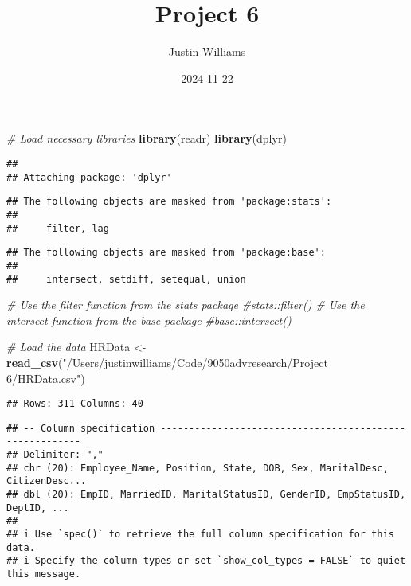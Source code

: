 \documentclass[
]{article}
\title{Project 6}
\author{Justin Williams}
\date{2024-11-22}
\newenvironment{Shaded}{\begin{snugshade}}{\end{snugshade}}
\newcommand{\CommentTok}[1]{\textcolor[rgb]{0.56,0.35,0.01}{\textit{#1}}}
\newcommand{\FunctionTok}[1]{\textcolor[rgb]{0.13,0.29,0.53}{\textbf{#1}}}
\newcommand{\NormalTok}[1]{#1}
\newcommand{\OtherTok}[1]{\textcolor[rgb]{0.56,0.35,0.01}{#1}}
\newcommand{\StringTok}[1]{\textcolor[rgb]{0.31,0.60,0.02}{#1}}
\begin{document}
\maketitle

\begin{Shaded}
\begin{Highlighting}[]
\CommentTok{\# Load necessary libraries}
\FunctionTok{library}\NormalTok{(readr)}
\FunctionTok{library}\NormalTok{(dplyr)}
\end{Highlighting}
\end{Shaded}

\begin{verbatim}
## 
## Attaching package: 'dplyr'
\end{verbatim}

\begin{verbatim}
## The following objects are masked from 'package:stats':
## 
##     filter, lag
\end{verbatim}

\begin{verbatim}
## The following objects are masked from 'package:base':
## 
##     intersect, setdiff, setequal, union
\end{verbatim}

\begin{Shaded}
\begin{Highlighting}[]
\CommentTok{\# Use the filter function from the stats package}
\CommentTok{\#stats::filter()}
\CommentTok{\# Use the intersect function from the base package}
\CommentTok{\#base::intersect()}

\CommentTok{\# Load the data}
\NormalTok{HRData }\OtherTok{\textless{}{-}} \FunctionTok{read\_csv}\NormalTok{(}\StringTok{"/Users/justinwilliams/Code/9050advresearch/Project 6/HRData.csv"}\NormalTok{)}
\end{Highlighting}
\end{Shaded}

\begin{verbatim}
## Rows: 311 Columns: 40
\end{verbatim}

\begin{verbatim}
## -- Column specification --------------------------------------------------------
## Delimiter: ","
## chr (20): Employee_Name, Position, State, DOB, Sex, MaritalDesc, CitizenDesc...
## dbl (20): EmpID, MarriedID, MaritalStatusID, GenderID, EmpStatusID, DeptID, ...
## 
## i Use `spec()` to retrieve the full column specification for this data.
## i Specify the column types or set `show_col_types = FALSE` to quiet this message.
\end{verbatim}
\end{document}
